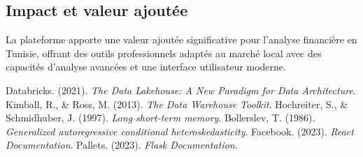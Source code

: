 \documentclass[12pt,a4paper]{article}
\begin{document}
\subsection{Impact et valeur ajoutée}
La plateforme apporte une valeur ajoutée significative pour l'analyse financière en Tunisie, offrant des outils professionnels adaptés au marché local avec des capacités d'analyse avancées et une interface utilisateur moderne.

\begin{thebibliography}{99}
 Databricks. (2021). \textit{The Data Lakehouse: A New Paradigm for Data Architecture}.
 Kimball, R., \& Ross, M. (2013). \textit{The Data Warehouse Toolkit}.
 Hochreiter, S., \& Schmidhuber, J. (1997). \textit{Long short-term memory}.
 Bollerslev, T. (1986). \textit{Generalized autoregressive conditional heteroskedasticity}.
 Facebook. (2023). \textit{React Documentation}.
 Pallets. (2023). \textit{Flask Documentation}.
\end{thebibliography}
\end{document}
